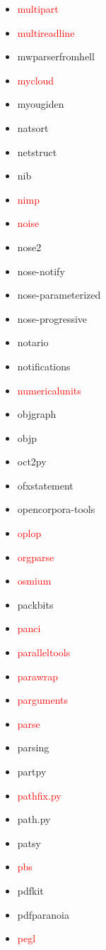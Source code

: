 \documentclass{l4proj}
\begin{document}
\begin{appendices}
{\begin{itemize}
\item\textcolor{red}{multipart}
\item\textcolor{red}{multireadline}
\item mwparserfromhell
\item\textcolor{red}{mycloud}
\item myougiden
\item natsort
\item netstruct
\item nib
\item\textcolor{red}{nimp}
\item\textcolor{red}{noise}
\item nose2
\item nose-notify
\item nose-parameterized
\item nose-progressive
\item notario
\item notifications
\item\textcolor{red}{numericalunits}
\item objgraph
\item objp
\item oct2py
\item ofxstatement
\end{itemize}
}%
\clearpage
\noindent\parbox[t]{0.32\textwidth}{\raggedright%
\begin{itemize}
\item opencorpora-tools
\item\textcolor{red}{oplop}
\item\textcolor{red}{orgparse}
\item\textcolor{red}{osmium}
\item packbits
\item\textcolor{red}{panci}
\item\textcolor{red}{paralleltools}
\item\textcolor{red}{parawrap}
\item\textcolor{red}{parguments}
\item\textcolor{red}{parse}
\item parsing
\item partpy
\item\textcolor{red}{pathfix.py}
\item path.py
\item patsy
\item\textcolor{red}{pbs}
\item pdfkit
\item pdfparanoia
\item\textcolor{red}{pegl}

\end{itemize}}
\end{appendices}
\end{document}

